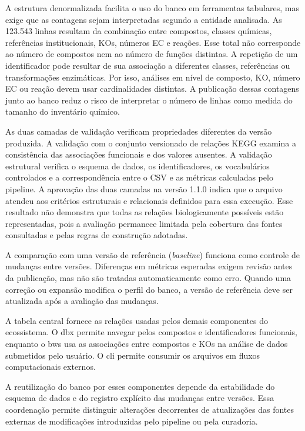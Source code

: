 A estrutura denormalizada facilita o uso do banco em ferramentas tabulares,
mas exige que as contagens sejam interpretadas segundo a entidade analisada.
As 123.543 linhas resultam da combinação entre compostos, classes químicas,
referências institucionais, KOs, números EC e reações. Esse total não
corresponde ao número de compostos nem ao número de funções distintas. A repetição de um identificador pode resultar de sua associação a diferentes
classes, referências ou transformações enzimáticas. Por isso, análises em
nível de composto, KO, número EC ou reação devem usar cardinalidades
distintas. A publicação dessas contagens junto ao banco reduz o risco de
interpretar o número de linhas como medida do tamanho do inventário químico.

As duas camadas de validação verificam propriedades diferentes da versão
produzida. A validação com o conjunto versionado de relações KEGG examina a
consistência das associações funcionais e dos valores ausentes. A validação
estrutural verifica o esquema de dados, os identificadores, os vocabulários
controlados e a correspondência entre o CSV e as métricas calculadas pelo
pipeline. A aprovação das duas camadas na versão 1.1.0 indica que o arquivo atendeu aos
critérios estruturais e relacionais definidos para essa execução. Esse
resultado não demonstra que todas as relações biologicamente possíveis estão
representadas, pois a avaliação permanece limitada pela cobertura das fontes
consultadas e pelas regras de construção adotadas.

A comparação com uma versão de referência (\textit{baseline}) funciona como
controle de mudanças entre versões. Diferenças em métricas esperadas exigem
revisão antes da publicação, mas não são tratadas automaticamente como erro.
Quando uma correção ou expansão modifica o perfil do banco, a versão de
referência deve ser atualizada após a avaliação das mudanças.

A tabela central fornece as relações usadas pelos demais componentes do
ecossistema. O \gls{dbx} permite navegar pelos compostos e identificadores
funcionais, enquanto o \gls{bws} usa as associações entre compostos e KOs na
análise de dados submetidos pelo usuário. O \gls{cli} permite consumir os
arquivos em fluxos computacionais externos.

A reutilização do banco por esses componentes depende da estabilidade do
esquema de dados e do registro explícito das mudanças entre versões. Essa
coordenação permite distinguir alterações decorrentes de atualizações das
fontes externas de modificações introduzidas pelo pipeline ou pela curadoria.
